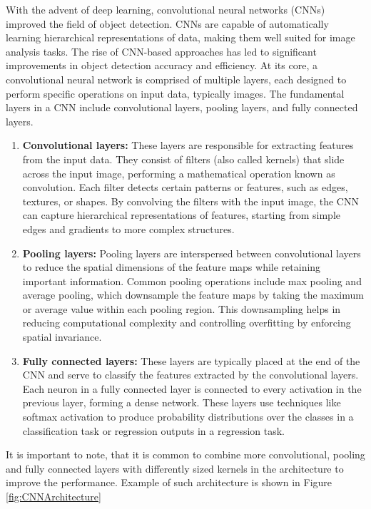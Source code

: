 With the advent of deep learning, convolutional neural networks (CNNs) improved the field of object detection. CNNs are
capable of automatically learning hierarchical representations of data, making them well suited for image analysis
tasks. The rise of CNN-based approaches has led to significant improvements in object detection accuracy and efficiency.
At its core, a convolutional neural network is comprised of multiple layers, each designed to perform specific operations on input data, typically images. The fundamental layers in a CNN include convolutional layers, pooling layers, and fully connected layers.
\begin{enumerate}
  \item \textbf{Convolutional layers:} These layers are responsible for extracting features from the input data. They consist of filters (also called kernels) that slide across the input image, performing a mathematical operation known as convolution. Each filter detects certain patterns or features, such as edges, textures, or shapes. By convolving the filters with the input image, the CNN can capture hierarchical representations of features, starting from simple edges and gradients to more complex structures.
  \item \textbf{Pooling layers:} Pooling layers are interspersed between convolutional layers to reduce the spatial dimensions of the feature maps while retaining important information. Common pooling operations include max pooling and average pooling, which downsample the feature maps by taking the maximum or average value within each pooling region. This downsampling helps in reducing computational complexity and controlling overfitting by enforcing spatial invariance.
  \item \textbf{Fully connected layers:} These layers are typically placed at the end of the CNN and serve to classify the features extracted by the convolutional layers. Each neuron in a fully connected layer is connected to every activation in the previous layer, forming a dense network. These layers use techniques like softmax activation to produce probability distributions over the classes in a classification task or regression outputs in a regression task.
\end{enumerate}
It is important to note, that it is common to combine more convolutional, pooling and fully connected layers with differently sized kernels in the architecture to improve the performance. Example of such architecture is shown in Figure \ref{fig:CNNArchitecture}

